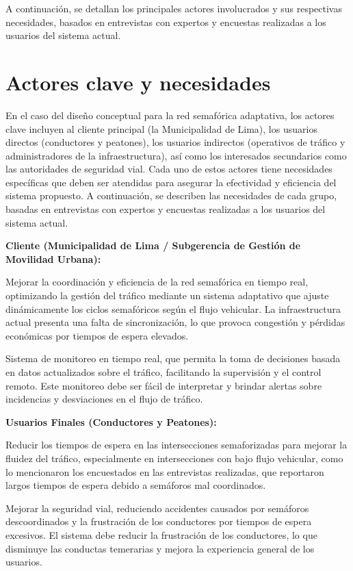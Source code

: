 \documentclass[12pt,a4paper,oneside]{report}
\begin{document}
A continuación, se detallan los principales actores involucrados y sus respectivas necesidades, basados en entrevistas con expertos y encuestas realizadas a los usuarios del sistema actual.

\section{Actores clave y necesidades}\label{actores-clave-y-necesidades}

En el caso del diseño conceptual para la red semafórica adaptativa, los actores clave incluyen al cliente principal (la Municipalidad de Lima), los usuarios directos (conductores y peatones), los usuarios indirectos (operativos de tráfico y administradores de la infraestructura), así como los interesados secundarios como las autoridades de seguridad vial. Cada uno de estos actores tiene necesidades específicas que deben ser atendidas para asegurar la efectividad y eficiencia del sistema propuesto. A continuación, se describen las necesidades de cada grupo, basadas en entrevistas con expertos y encuestas realizadas a los usuarios del sistema actual.

\textbf{Cliente (Municipalidad de Lima / Subgerencia de Gestión de Movilidad Urbana):}

Mejorar la coordinación y eficiencia de la red semafórica en tiempo real, optimizando la gestión del tráfico mediante un sistema adaptativo que ajuste dinámicamente los ciclos semafóricos según el flujo vehicular. La infraestructura actual presenta una falta de sincronización, lo que provoca congestión y pérdidas económicas por tiempos de espera elevados.

Sistema de monitoreo en tiempo real, que permita la toma de decisiones basada en datos actualizados sobre el tráfico, facilitando la supervisión y el control remoto. Este monitoreo debe ser fácil de interpretar y brindar alertas sobre incidencias y desviaciones en el flujo de tráfico.

\textbf{Usuarios Finales (Conductores y Peatones):}

Reducir los tiempos de espera en las intersecciones semaforizadas para mejorar la fluidez del tráfico, especialmente en intersecciones con bajo flujo vehicular, como lo mencionaron los encuestados en las entrevistas realizadas, que reportaron largos tiempos de espera debido a semáforos mal coordinados.

Mejorar la seguridad vial, reduciendo accidentes causados por semáforos descoordinados y la frustración de los conductores por tiempos de espera excesivos. El sistema debe reducir la frustración de los conductores, lo que disminuye las conductas temerarias y mejora la experiencia general de los usuarios.
\end{document}
